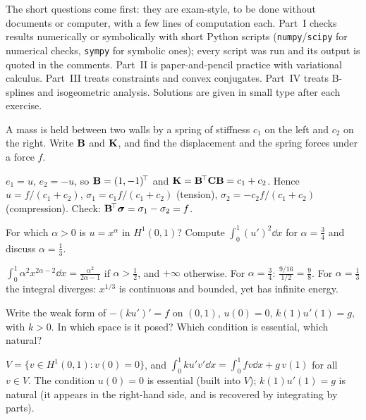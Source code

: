 \label{sec:var-exo}
The short questions come first: they are exam-style, to be done without
documents or computer, with a few lines of computation each.
Part~I checks results numerically or symbolically with short Python
scripts (\texttt{numpy}/\texttt{scipy} for numerical checks, \texttt{sympy} for
symbolic ones); every script was run and its output is quoted in the
comments. Part~II is
paper-and-pencil practice with variational calculus. Part~III treats
constraints and convex conjugates. Part~IV treats B-splines and isogeometric
analysis. Solutions are given in small type after each exercise.


\label{exo:sq-springs}
A mass is held between two walls by a spring of stiffness $c_1$ on the left
and $c_2$ on the right. Write $\mathbf{B}$ and $\mathbf{K}$, and find the
displacement and the spring forces under a force $f$.
\begin{solution}
$e_1=u$, $e_2=-u$, so $\mathbf{B}=(1,-1)^{\!\top}$ and
$\mathbf{K}=\mathbf{B}^{\!\top}\mathbf{C}\mathbf{B}=c_1+c_2$. Hence $u=f/(c_1+c_2)$,
$\sigma_1=c_1f/(c_1+c_2)$ (tension), $\sigma_2=-c_2f/(c_1+c_2)$ (compression).
Check: $\mathbf{B}^{\!\top}\bm{\sigma}=\sigma_1-\sigma_2=f$.
\end{solution}

\label{exo:sq-h1}
For which $\alpha>0$ is $u=x^\alpha$ in $H^1(0,1)$? Compute
$\displaystyle \int_0^1(u')^2\dd x$ for $\alpha=\tfrac34$ and discuss
$\alpha=\tfrac13$.
\begin{solution}
$\displaystyle \int_0^1\alpha^2x^{2\alpha-2}\dd x=\frac{\alpha^2}{2\alpha-1}$ if
$\alpha>\tfrac12$, and $+\infty$ otherwise. For $\alpha=\tfrac34$:
$\tfrac{9/16}{1/2}=\tfrac98$. For $\alpha=\tfrac13$ the integral diverges: $x^{1/3}$
is continuous and bounded, yet has infinite energy.
\end{solution}

\label{exo:sq-bc}
Write the weak form of $-(ku')'=f$ on $(0,1)$, $u(0)=0$, $k(1)u'(1)=g$, with
$k>0$. In which space is it posed? Which condition is essential, which natural?
\begin{solution}
$V=\{v\in H^1(0,1):v(0)=0\}$, and
$\displaystyle \int_0^1ku'v'\dd x=\int_0^1fv\dd x+g\,v(1)$ for all $v\in V$. The
condition $u(0)=0$ is essential (built into $V$); $k(1)u'(1)=g$ is natural (it
appears in the right-hand side, and is recovered by integrating by parts).
\end{solution}

